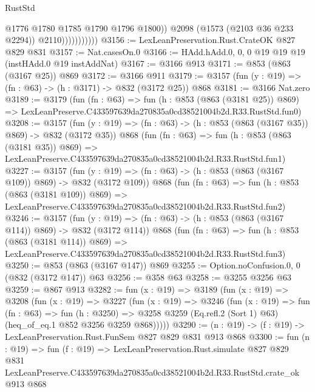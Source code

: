 \begin{lexlean}{RustStd}
\begin{coremodule}
                              @1776
                              @1780
                              @1785
                              @1790
                              @1796
                              @1800))
                          @2098
                          (@1573 (@2103 @36 @233 @2294))
                          @2110)))))))))))
@3156 := LexLeanPreservation.Rust.CrateOK @827 @829 @831
@3157 := Nat.casesOn.{0}
@3166 := HAdd.hAdd.{0, 0, 0} @19 @19 @19 (instHAdd.{0} @19 instAddNat)
@3167 := @3166 @913
@3171 := @853 (@863 (@3167 @25)) @869
@3172 := @3166 @911
@3179 := @3157 (fun (y : @19) => (fn : @63) -> (h : @3171) -> @832 (@3172 @25)) @868
@3181 := @3166 Nat.zero
@3189 := @3179
    (fun (fn : @63) =>
    fun (h : @853 (@863 (@3181 @25)) @869) =>
    LexLeanPreserve.C433597639da270835a0cd38521004b2d.R33.RustStd.fun0)
@3208 := @3157
    (fun (y : @19) => (fn : @63) -> (h : @853 (@863 (@3167 @35)) @869) -> @832 (@3172 @35))
    @868
    (fun (fn : @63) =>
    fun (h : @853 (@863 (@3181 @35)) @869) =>
    LexLeanPreserve.C433597639da270835a0cd38521004b2d.R33.RustStd.fun1)
@3227 := @3157
    (fun (y : @19) => (fn : @63) -> (h : @853 (@863 (@3167 @109)) @869) -> @832 (@3172 @109))
    @868
    (fun (fn : @63) =>
    fun (h : @853 (@863 (@3181 @109)) @869) =>
    LexLeanPreserve.C433597639da270835a0cd38521004b2d.R33.RustStd.fun2)
@3246 := @3157
    (fun (y : @19) => (fn : @63) -> (h : @853 (@863 (@3167 @114)) @869) -> @832 (@3172 @114))
    @868
    (fun (fn : @63) =>
    fun (h : @853 (@863 (@3181 @114)) @869) =>
    LexLeanPreserve.C433597639da270835a0cd38521004b2d.R33.RustStd.fun3)
@3250 := @853 (@863 (@3167 @147)) @869
@3255 := Option.noConfusion.{0, 0} (@832 (@3172 @147)) @63
@3256 := @358 @63
@3258 := @3255 @3256 @63
@3259 := @867 @913
@3282 := fun (x : @19) =>
  @3189
    (fun (x : @19) =>
    @3208
      (fun (x : @19) =>
      @3227
        (fun (x : @19) =>
        @3246
          (fun (x : @19) =>
          fun (fn : @63) =>
          fun (h : @3250) =>
          @3258 @3259 (Eq.refl.{2} (Sort 1) @63) (heq_of_eq.{1} @852 @3256 @3259 @868)))))
@3290 := (n : @19) -> (f : @19) -> LexLeanPreservation.Rust.FunSem @827 @829 @831 @913 @868
@3300 := fun (n : @19) =>
  fun (f : @19) =>
  LexLeanPreservation.Rust.simulate
    @827
    @829
    @831
    LexLeanPreserve.C433597639da270835a0cd38521004b2d.R33.RustStd.crate_ok
    @913
    @868
\end{coremodule}
\end{lexlean}
